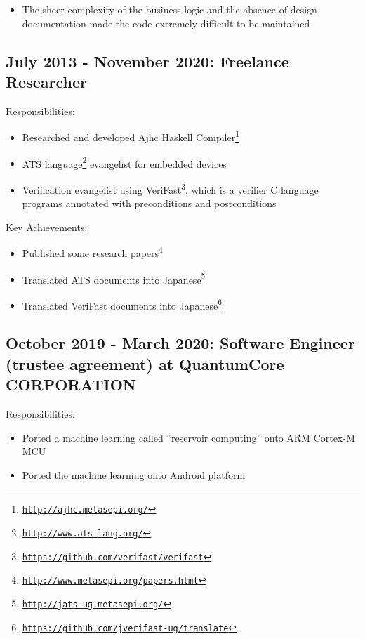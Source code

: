 \documentclass[letterpaper]{article}
\begin{document}
\begin{itemize}
  \item The sheer complexity of the business logic and the absence of design documentation made the code extremely difficult to be maintained
\end{itemize}

\subsection*{July 2013 - November 2020: Freelance Researcher}

\noindent Responsibilities:

\begin{itemize}
  \item Researched and developed Ajhc Haskell Compiler\footnote{\href{http://ajhc.metasepi.org/}{\tt http://ajhc.metasepi.org/}}
  \item ATS language\footnote{\href{http://www.ats-lang.org/}{\tt http://www.ats-lang.org/}} evangelist for embedded devices
  \item Verification evangelist using VeriFast\footnote{\href{https://github.com/verifast/verifast}{\tt https://github.com/verifast/verifast}}, which is a verifier C language programs annotated with preconditions and postconditions
\end{itemize}

\noindent Key Achievements:

\begin{itemize}
  \item Published some research papers\footnote{\href{http://www.metasepi.org/papers.html}{\tt http://www.metasepi.org/papers.html}}
  \item Translated ATS documents into Japanese\footnote{\href{http://jats-ug.metasepi.org/}{\tt http://jats-ug.metasepi.org/}}
  \item Translated VeriFast documents into Japanese\footnote{\href{https://github.com/jverifast-ug/translate}{\tt https://github.com/jverifast-ug/translate}}
\end{itemize}

\subsection*{October 2019 - March 2020: Software Engineer (trustee agreement) at QuantumCore CORPORATION}

\noindent Responsibilities:

\begin{itemize}
  \item Ported a machine learning called ``reservoir computing'' onto ARM Cortex-M MCU
  \item Ported the machine learning onto Android platform
\end{itemize}
\end{document}
